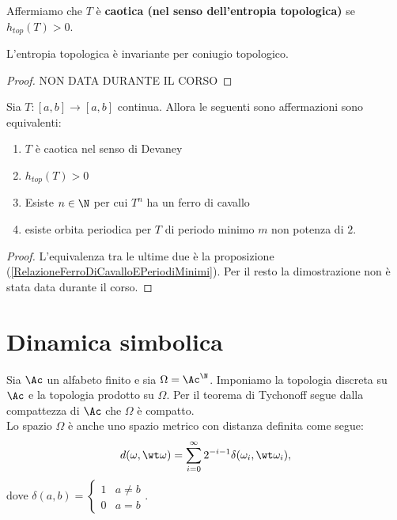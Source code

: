 \begin{definition}
Affermiamo che $T$ \`e \textbf{caotica (nel senso dell'entropia topologica)} se $h_{top}(T)>0$.
\end{definition}

\begin{proposition}\label{EntropiaTopologicaInvariantePerConiugioTopologico}
L'entropia topologica \`e invariante per coniugio topologico.
\end{proposition}
\begin{proof}
NON DATA DURANTE IL CORSO
\end{proof}

\begin{theorem}\label{CaratterizzazioneCaos}
Sia $T:[a,b]\to [a,b]$ continua. Allora le seguenti sono affermazioni sono equivalenti:
\begin{enumerate}
\item $T$ \`e caotica nel senso di Devaney
\item $h_{top}(T)>0$
\item Esiste $n\in\N$ per cui $T^n$ ha un ferro di cavallo
\item esiste orbita periodica per $T$ di periodo minimo $m$ non potenza di $2$.
\end{enumerate}
\end{theorem}
\begin{proof}
L'equivalenza tra le ultime due \`e la proposizione (\ref{RelazioneFerroDiCavalloEPeriodiMinimi}). Per il resto la dimostrazione non \`e stata data durante il corso.
\end{proof}

\section{Dinamica simbolica}
Sia $\Ac$ un alfabeto finito e sia $\Omega=\Ac^\N$. Imponiamo la topologia discreta su $\Ac$ e la topologia prodotto su $\Omega$. Per il teorema di Tychonoff segue dalla compattezza di $\Ac$ che $\Omega$ \`e compatto.\\
Lo spazio $\Omega$ \`e anche uno spazio metrico con distanza definita come segue:
\[d(\omega,\wt \omega)=\sum_{i=0}^\infty 2^{-i-1}\delta(\omega_i,\wt \omega_i),\]
dove $\delta(a,b)=\begin{cases}
1 & a\neq b\\
0 & a=b
\end{cases}$.

